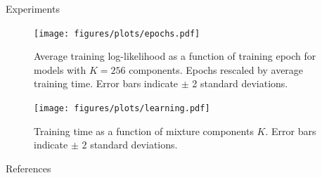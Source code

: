 \documentclass[final]{beamer}
\newlength{\sepwidth}
\newlength{\colwidth}
\newcommand{\separatorcolumn}{\begin{column}{\sepwidth}\end{column}}
\begin{document}
\begin{frame}[t]
\begin{columns}[t]
\begin{column}{\colwidth}
\begin{block}{Experiments}
        \begin{figure}
        \centering
        \texttt{[image: figures/plots/epochs.pdf]}
        \caption{Average training log-likelihood as a function of training epoch for models with $K=256$ components. Epochs rescaled by average training time. Error bars indicate $\pm$ 2 standard deviations.}
        \end{figure}

        \begin{figure}
        \centering
        \texttt{[image: figures/plots/learning.pdf]}
        \caption{Training time as a function of mixture components $K$. Error bars indicate $\pm$ 2 standard deviations.}
        \end{figure}
    \end{block}

    \begin{block}{References}

    \footnotesize{}

    \end{block}
    
\end{column}

\separatorcolumn
\end{columns}
\end{frame}
\end{document}
